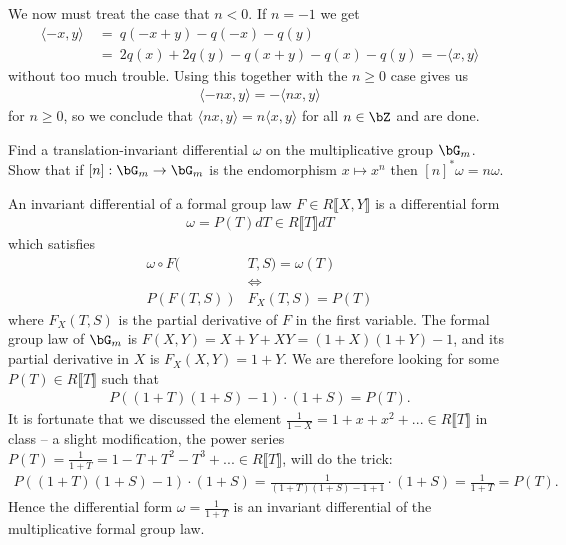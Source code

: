 \begin{homework}[e]
\begin{prf}
		We now must treat the case that $n < 0$. If $n = -1$ we get
		\begin{align*}
			\langle -x,y\rangle &~=~ q(-x + y) - q(-x) - q(y) \\
			  &~=~ 2q(x) + 2q(y) - q(x+y) - q(x) - q(y) = -\langle x,y\rangle
		\end{align*}
		without too much trouble. Using this together with the $n\geq 0$ case gives us
		 \begin{align*}
			\langle -nx,y\rangle = - \langle nx,y\rangle
		\end{align*}
	    for $n \geq 0$, so we conclude that $\langle nx,y\rangle = n\langle x,y\rangle$ for all $n \in \bZ$ and are done.
	\end{prf}
	\prob Find a translation-invariant differential $\omega$ on the multiplicative group $\bG_m$. Show that if $[n]:\bG_m \to \bG_m$ is the endomorphism $x \mapsto x^n$ then $[n]^*\omega = n\omega$.
	\begin{prf}
		An invariant differential of a formal group law $F \in R\llbracket X,Y\rrbracket$ is a differential form
		\begin{align*}
			\omega = P(T)dT \in R\llbracket T\rrbracket dT
		\end{align*}
		which satisfies
		\begin{align*}
			\omega \circ F(&T,S) = \omega(T) \\
						   &\iff \\
			P(F(T,S))&F_X(T,S) = P(T)
		\end{align*}
		where $F_X(T,S)$ is the partial derivative of $F$ in the first variable. The formal group law of $\bG_m$ is $F(X,Y) = X + Y + XY = (1 + X)(1 + Y) -1$, and its partial derivative in $X$ is $F_X(X,Y) = 1 + Y$. We are therefore looking for some $P(T) \in R\llbracket T\rrbracket$ such that
		\begin{align*}
			P((1+T)(1+S)-1) \cdot (1+S) = P(T).
		\end{align*}
		It is fortunate that we discussed the element $\frac{1}{1 - X} = 1 + x + x^2 + ... \in R\llbracket T\rrbracket$ in class -- a slight modification, the power series $P(T) = \frac{1}{1 + T} = 1 - T + T^2 - T^3 + ... \in R\llbracket T\rrbracket$, will do the trick:
		\begin{align*}
			P((1+T)(1+S)-1)\cdot (1 + S) = \frac{1}{(1+T)(1+S) - 1 + 1}\cdot (1 + S) = \frac{1}{1 + T} = P(T).
		\end{align*}
		Hence the differential form $\omega = \frac{1}{1 + T}$ is an invariant differential of the multiplicative formal group law.
	\end{prf}
\end{homework}



